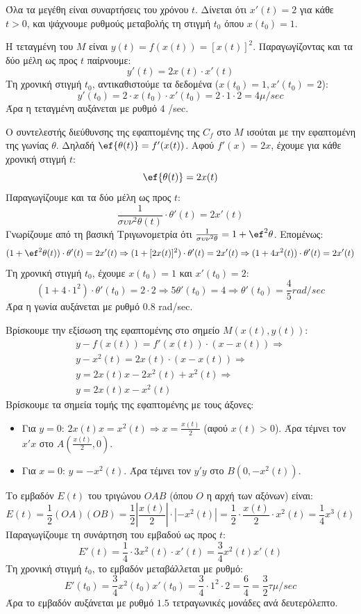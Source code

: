 \lysh
Όλα τα μεγέθη είναι συναρτήσεις του χρόνου $t$. Δίνεται ότι $x'(t) = 2$ για κάθε $t>0$, και ψάχνουμε ρυθμούς μεταβολής τη στιγμή $t_0$ όπου $x(t_0) = 1$.
\begin{alist}
\item Η τεταγμένη του $M$ είναι $y(t) = f(x(t)) = [x(t)]^2$. Παραγωγίζοντας και τα δύο μέλη ως προς $t$ παίρνουμε: 
\[ y'(t) = 2x(t) \cdot x'(t) \]
Τη χρονική στιγμή $t_0$, αντικαθιστούμε τα δεδομένα ($x(t_0)=1, x'(t_0)=2$):
\[ y'(t_0) = 2 \cdot x(t_0) \cdot x'(t_0) = 2 \cdot 1 \cdot 2 = 4 \si{ \mu/sec} \]
Άρα η τεταγμένη αυξάνεται με ρυθμό $4$ \si{\mu/sec}.

\item Ο συντελεστής διεύθυνσης της εφαπτομένης της $C_f$ στο $M$ ισούται με την εφαπτομένη της γωνίας $\theta$. Δηλαδή $\ef{\theta(t)} = f'(x(t))$.
Αφού $f'(x) = 2x$, έχουμε για κάθε χρονική στιγμή $t$:
\[ \ef{\theta(t)} = 2x(t) \]
Παραγωγίζουμε και τα δύο μέλη ως προς $t$:
\[ \frac{1}{\sigma\upsilon\nu^2\theta(t)} \cdot \theta'(t) = 2x'(t) \]
Γνωρίζουμε από τη βασική Τριγωνομετρία ότι $\frac{1}{\sigma\upsilon\nu^2\theta} = 1 + \ef^2\theta$. Επομένως:
\[ (1 + \ef^2\theta(t)) \cdot \theta'(t) = 2x'(t) \Rightarrow (1 + [2x(t)]^2) \cdot \theta'(t) = 2x'(t) \Rightarrow (1 + 4x^2(t)) \cdot \theta'(t) = 2x'(t) \]
Τη χρονική στιγμή $t_0$, έχουμε $x(t_0) = 1$ και $x'(t_0) = 2$:
\[ (1 + 4 \cdot 1^2) \cdot \theta'(t_0) = 2 \cdot 2 \Rightarrow 5\theta'(t_0) = 4 \Rightarrow \theta'(t_0) = \frac{4}{5} \si{ rad/sec} \]
Άρα η γωνία αυξάνεται με ρυθμό $0.8$ \si{rad/sec}.

\item Βρίσκουμε την εξίσωση της εφαπτομένης στο σημείο $M(x(t), y(t))$:
\begin{gather*}
y - f(x(t)) = f'(x(t)) \cdot (x - x(t)) \Rightarrow \\
y - x^2(t) = 2x(t) \cdot (x - x(t)) \Rightarrow \\
y = 2x(t)x - 2x^2(t) + x^2(t) \Rightarrow \\
y = 2x(t)x - x^2(t)
\end{gather*}
Βρίσκουμε τα σημεία τομής της εφαπτομένης με τους άξονες:
\begin{itemize}
\item Για $y=0$: $2x(t)x = x^2(t) \Rightarrow x = \frac{x(t)}{2}$ (αφού $x(t)>0$). Άρα τέμνει τον $x'x$ στο $A\left(\frac{x(t)}{2}, 0\right)$.
\item Για $x=0$: $y = -x^2(t)$. Άρα τέμνει τον $y'y$ στο $B(0, -x^2(t))$.
\end{itemize}
Το εμβαδόν $E(t)$ του τριγώνου $OAB$ (όπου $O$ η αρχή των αξόνων) είναι:
\[ E(t) = \frac{1}{2} (OA)(OB) = \frac{1}{2} \left| \frac{x(t)}{2} \right| \cdot |-x^2(t)| = \frac{1}{2} \cdot \frac{x(t)}{2} \cdot x^2(t) = \frac{1}{4}x^3(t) \]
Παραγωγίζουμε τη συνάρτηση του εμβαδού ως προς $t$:
\[ E'(t) = \frac{1}{4} \cdot 3x^2(t) \cdot x'(t) = \frac{3}{4} x^2(t) x'(t) \]
Τη χρονική στιγμή $t_0$, το εμβαδόν μεταβάλλεται με ρυθμό:
\[ E'(t_0) = \frac{3}{4} x^2(t_0) x'(t_0) = \frac{3}{4} \cdot 1^2 \cdot 2 = \frac{6}{4} = \frac{3}{2} \si{ \tau\mu/sec} \]
Άρα το εμβαδόν αυξάνεται με ρυθμό $1.5$ τετραγωνικές μονάδες ανά δευτερόλεπτο.
\end{alist}

